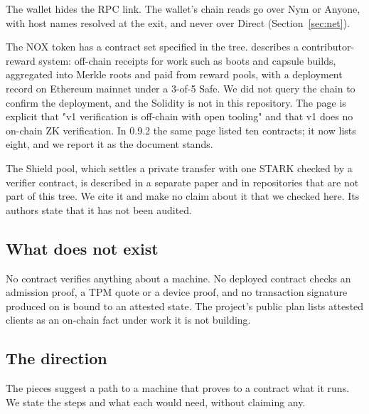 The wallet hides the RPC link. The wallet's chain reads go over Nym or Anyone, with host names resolved at the exit, and never over Direct (Section~\ref{sec:net}).

The NOX token has a contract set specified in the tree.  describes a contributor-reward system: off-chain receipts for work such as boots and capsule builds, aggregated into Merkle roots and paid from reward pools, with a deployment record on Ethereum mainnet under a 3-of-5 Safe. We did not query the chain to confirm the deployment, and the Solidity is not in this repository. The page is explicit that "v1 verification is off-chain with open tooling" and that v1 does no on-chain ZK verification. In 0.9.2 the same page listed ten contracts; it now lists eight, and we report it as the document stands.

The Shield pool, which settles a private transfer with one STARK checked by a verifier contract, is described in a separate paper \cite{shield} and in repositories that are not part of this tree. We cite it and make no claim about it that we checked here. Its authors state that it has not been audited.

\subsection{What does not exist}

No contract verifies anything about a machine. No deployed contract checks an admission proof, a TPM quote or a device proof, and no transaction signature produced on \nonos{} is bound to an attested state. The project's public plan lists attested clients as an on-chain fact under work it is not building.

\subsection{The direction}

The pieces suggest a path to a machine that proves to a contract what it runs. We state the steps and what each would need, without claiming any.

